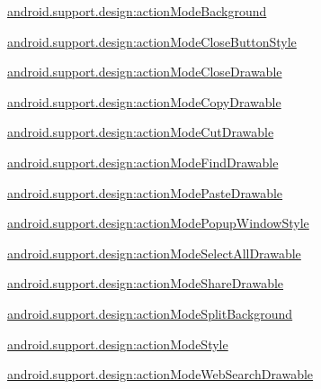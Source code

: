 {\ttfamily \hyperlink{classandroid_1_1support_1_1design_1_1R_1_1styleable_a558b51abb51bf7789c77678e8251a2e1}{android.\+support.\+design\+:action\+Mode\+Background}}

{\ttfamily \hyperlink{classandroid_1_1support_1_1design_1_1R_1_1styleable_a140f9d445f81bdf8ba5f95c0542ca529}{android.\+support.\+design\+:action\+Mode\+Close\+Button\+Style}}

{\ttfamily \hyperlink{classandroid_1_1support_1_1design_1_1R_1_1styleable_aac470b6ebccb4d44a9441e2ca1de77dc}{android.\+support.\+design\+:action\+Mode\+Close\+Drawable}}

{\ttfamily \hyperlink{classandroid_1_1support_1_1design_1_1R_1_1styleable_afef45b44846fb895b555dc4c25849622}{android.\+support.\+design\+:action\+Mode\+Copy\+Drawable}}

{\ttfamily \hyperlink{classandroid_1_1support_1_1design_1_1R_1_1styleable_aa4f155cf001a007b34829305ec1b8bf4}{android.\+support.\+design\+:action\+Mode\+Cut\+Drawable}}

{\ttfamily \hyperlink{classandroid_1_1support_1_1design_1_1R_1_1styleable_a87e11e5ef34e5a6b9426ee90ef001590}{android.\+support.\+design\+:action\+Mode\+Find\+Drawable}}

{\ttfamily \hyperlink{classandroid_1_1support_1_1design_1_1R_1_1styleable_af873cad74307d6ae72d31314ebb7eb9d}{android.\+support.\+design\+:action\+Mode\+Paste\+Drawable}}

{\ttfamily \hyperlink{classandroid_1_1support_1_1design_1_1R_1_1styleable_af493b8a4fc8e112fffaddcdef4b737bb}{android.\+support.\+design\+:action\+Mode\+Popup\+Window\+Style}}

{\ttfamily \hyperlink{classandroid_1_1support_1_1design_1_1R_1_1styleable_aaf0de120209af4d10c6850f628fc12b1}{android.\+support.\+design\+:action\+Mode\+Select\+All\+Drawable}}

{\ttfamily \hyperlink{classandroid_1_1support_1_1design_1_1R_1_1styleable_a5cc3bc3db3f4a7934ec84ad88a523f1a}{android.\+support.\+design\+:action\+Mode\+Share\+Drawable}}

{\ttfamily \hyperlink{classandroid_1_1support_1_1design_1_1R_1_1styleable_a4b4b91c68eff93edcf95cbb4b498cfeb}{android.\+support.\+design\+:action\+Mode\+Split\+Background}}

{\ttfamily \hyperlink{classandroid_1_1support_1_1design_1_1R_1_1styleable_a6065b230562d4a76f8d2d8990f30a339}{android.\+support.\+design\+:action\+Mode\+Style}}

{\ttfamily \hyperlink{classandroid_1_1support_1_1design_1_1R_1_1styleable_a3150922f00e1e78287f30e03ef037a0a}{android.\+support.\+design\+:action\+Mode\+Web\+Search\+Drawable}}

